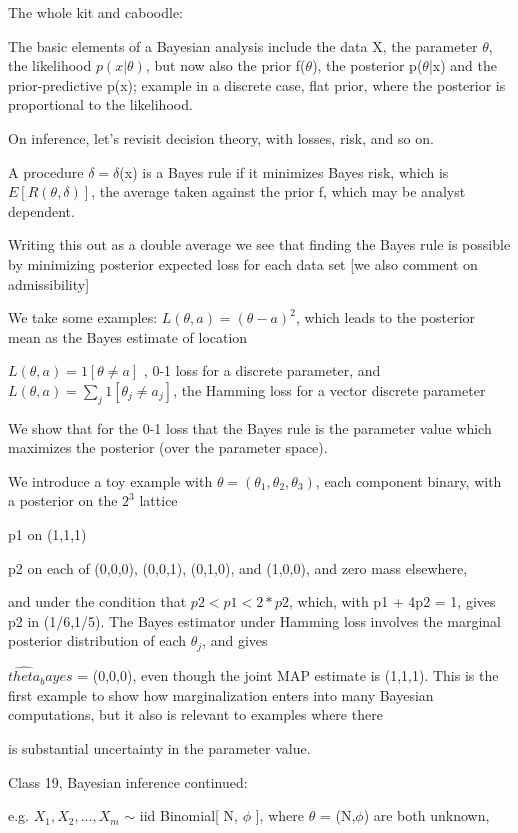 \documentclass[11pt,a4paper]{article}
\begin{document}
	The whole kit and caboodle:
	
	The basic elements of a Bayesian analysis include the data X, the parameter $\theta$, the likelihood $p(x|\theta)$, but now also the prior f($\theta$), the posterior p($\theta$|x) and the prior-predictive p(x); example in a discrete case, flat prior, where the posterior is proportional to the likelihood.
	
	On inference, let's revisit decision theory, with losses, risk, and so on. 
	
	A procedure $\delta = \delta$(x) is a Bayes rule if it minimizes Bayes risk, which is $E[ R(\theta, \delta)]$, the average taken against the prior f, which may be analyst dependent.
	
	Writing this out as a double average we see that finding the Bayes rule is possible by minimizing posterior expected loss for each data set  [we also comment on admissibility]
	
	We take some examples:    $L(\theta,a) = (\theta-a)^2$, which leads to the posterior mean as the Bayes estimate of location
	
	$L(\theta,a) = 1[\theta  \neq a ]$  , 0-1 loss for a discrete parameter, and $L(\theta,a) = \sum_j 1[\theta_j \neq a_j ]$, the Hamming loss for a vector discrete parameter
	
	We show that for the 0-1 loss that the Bayes rule is the parameter value which maximizes the posterior (over the parameter space).
	
	We introduce a toy example with $\theta = (\theta_1,\theta_2,\theta_3)$, each component binary, with a posterior on the $2^3$ lattice
	
	p1 on (1,1,1)
	
	p2 on each of (0,0,0),  (0,0,1), (0,1,0), and (1,0,0), and zero mass elsewhere,
	
	and under the condition that  $ p2 < p1 < 2*p2$, which, with p1 + 4p2 = 1, gives p2 in (1/6,1/5).   The Bayes estimator under Hamming loss involves the marginal posterior distribution of each $\theta_j$, and gives
	
	$\hat{theta}_bayes$ = (0,0,0), even though the joint MAP estimate is (1,1,1).     This is the first example to show how marginalization enters into many Bayesian computations, but it also is relevant to examples where there
	
	is substantial uncertainty in the parameter value.
	
	Class 19, Bayesian inference continued:
	
	e.g. $X_1, X_2, ..., X_m$ $\sim$ iid Binomial[ N, $\phi$ ], where $\theta$ = (N,$\phi$) are both unknown,
	
\end{document}
